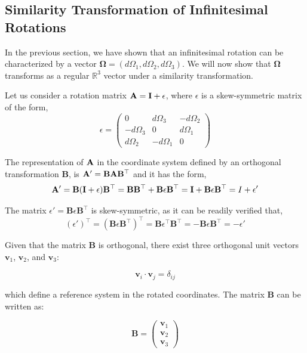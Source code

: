 \documentclass[12pt]{article}
\begin{document}
\subsection{Similarity Transformation of Infinitesimal Rotations}

In the previous section, we have shown that an infinitesimal rotation can be characterized by
a vector $\boldsymbol{\Omega} = (d\Omega_1, d\Omega_2, d\Omega_3)$. We will now show that
$\boldsymbol{\Omega}$ transforms as a regular $\mathbb{R}^3$ vector under a similarity
transformation.

Let us consider a rotation matrix $\vb{A} = \vb{I} + \epsilon$, where $\epsilon$ is a
skew-symmetric matrix of the form,
\[
  \epsilon =
  \begin{pmatrix}
    0           &  d\Omega_3 & -d\Omega_2 \\
    -d\Omega_3  &  0         &  d\Omega_1 \\
    d\Omega_2   & -d\Omega_1 &  0
  \end{pmatrix}
\]

The representation of $\vb{A}$ in the coordinate system defined by an orthogonal
transformation $\mathbf{B}$, is $\vb{A}' = \mathbf{B}\vb{A}\mathbf{B}^\top$ and it has the
form,
\[
  \vb{A}' = \mathbf{B}(\vb{I}+\epsilon)\mathbf{B}^\top
           = \mathbf{B}\mathbf{B}^\top + \mathbf{B}\epsilon\mathbf{B}^\top
           = \vb{I} + \mathbf{B}\epsilon\mathbf{B}^\top
           = I + \epsilon'
\]

The matrix $\epsilon' = \mathbf{B}\epsilon\mathbf{B}^\top$ is skew-symmetric, as it can be
readily verified that,
\[
  (\epsilon')^\top = (\mathbf{B}\epsilon\mathbf{B}^\top)^\top
                   = \mathbf{B}\epsilon^\top\mathbf{B}^\top
                   = -\mathbf{B}\epsilon\mathbf{B}^\top = -\epsilon'
\]

Given that the matrix $\mathbf{B}$ is orthogonal, there exist three orthogonal unit vectors
$\mathbf{v}_1$, $\mathbf{v}_2$, and $\mathbf{v}_3$:

\[
  \mathbf{v}_i \cdot \mathbf{v}_j = \delta_{ij}
\]

which define a reference system in the rotated coordinates. The matrix $\mathbf{B}$ can be
written as:

\[
  \mathbf{B} =
  \begin{pmatrix} \mathbf{v}_1 \\ \mathbf{v}_2 \\ \mathbf{v}_3 \end{pmatrix}
\]
\end{document}
